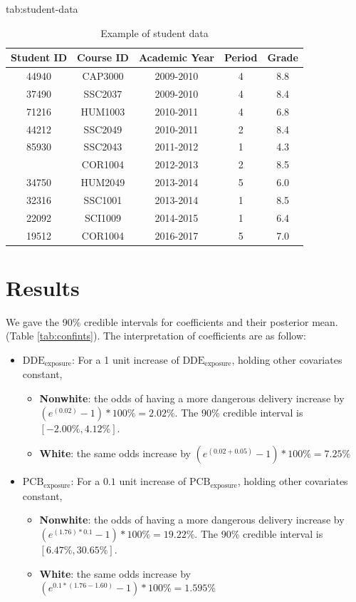 \documentclass[wcp]{jmlr}%
\begin{document}
\begin{table}[hbtp]
	\floatconts
	{tab:student-data}
	{\caption{Example of student data}}	
	{\begin{tabular}{ccccc}
		\toprule
		\bfseries Student ID &\bfseries Course ID &\bfseries Academic Year &\bfseries Period &\bfseries Grade\\
		\midrule
		44940 & CAP3000 & 2009-2010 & 4 & 8.8\\
		37490 & SSC2037 & 2009-2010 & 4 & 8.4\\
		71216 & HUM1003 & 2010-2011 & 4 & 6.8\\
		44212 & SSC2049 & 2010-2011 & 2 & 8.4\\
		85930 & SSC2043 & 2011-2012 & 1 & 4.3\\
		\addlinespace
		14492 & COR1004 & 2012-2013 & 2 & 8.5\\
		34750 & HUM2049 & 2013-2014 & 5 & 6.0\\
		32316 & SSC1001 & 2013-2014 & 1 & 8.5\\
		22092 & SCI1009 & 2014-2015 & 1 & 6.4\\
		19512 & COR1004 & 2016-2017 & 5 & 7.0\\
		\bottomrule
	\end{tabular}}	
\end{table}


\section{Results}
\label{sec:results}
We gave the 90\% credible intervals for coefficients and their posterior mean. (Table \ref{tab:confints}). The interpretation of coefficients are as follow:
\begin{itemize}
	\item $\text{DDE}_{\text{exposure}}$: For a 1 unit increase of $\text{DDE}_{\text{exposure}}$, holding other covariates constant,
		    \begin{itemize}
		    	\item \textbf{Nonwhite}: the odds of having a more dangerous delivery increase by $(e^{(0.02)}-1)*100\%=2.02\%$. The 90\% credible interval is $[-2.00\%, 4.12\%]$.
		    	\item \textbf{White}:  the same odds increase by $(e^{(0.02+0.05)}-1)*100\%=7.25\%$
		    \end{itemize}
	\item $\text{PCB}_{\text{exposure}}$: For a $0.1$ unit increase of $\text{PCB}_{\text{exposure}}$, holding other covariates constant,
			\begin{itemize}
				\item \textbf{Nonwhite}: the odds of having a more dangerous delivery increase by $(e^{(1.76)*0.1}-1)*100\%=19.22\%$. The 90\% credible interval is $[6.47\%,30.65\%]$.
				\item \textbf{White}:  the same odds increase by $(e^{0.1*(1.76-1.60)}-1)*100\%=1.595\%$
			\end{itemize}
\end{itemize}
\end{document}
